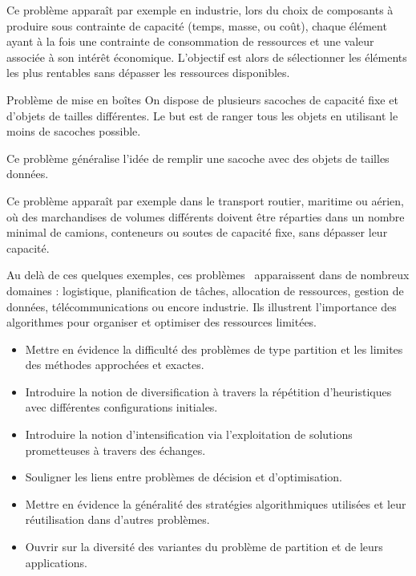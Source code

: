 \documentclass[a4paper,twoside]{article}
\begin{document}
Ce problème apparaît par exemple en industrie, lors du choix de composants à produire sous contrainte de capacité (temps, masse, ou coût), chaque élément ayant à la fois une contrainte de consommation de ressources et une valeur associée à son intérêt économique. L'objectif est alors de sélectionner les éléments les plus rentables sans dépasser les ressources disponibles.

\begin{definition}{Problème de mise en boîtes}
  On dispose de plusieurs sacoches de capacité fixe et d'objets de tailles différentes.
  Le but est de ranger tous les objets en utilisant le moins de sacoches possible.

  Ce problème généralise l'idée de remplir une sacoche avec des objets de tailles données.
\end{definition}

Ce problème apparaît par exemple dans le transport routier, maritime ou aérien, où des marchandises de volumes différents doivent être réparties dans un nombre minimal de camions, conteneurs ou soutes de capacité fixe, sans dépasser leur capacité.

Au delà de ces quelques exemples, ces problèmes~\cite{PP,SSP,KP,MS,BP} apparaissent dans de nombreux domaines : logistique, planification de tâches, allocation de ressources, gestion de données, télécommunications ou encore industrie.
Ils illustrent l'importance des algorithmes pour organiser et optimiser des ressources limitées.

\begin{debriefing}
  \begin{itemize}
  \item Mettre en évidence la difficulté des problèmes de type partition et les limites des méthodes approchées et exactes.
  \item Introduire la notion de diversification à travers la répétition d'heuristiques avec différentes configurations initiales.
  \item Introduire la notion d'intensification via l'exploitation de solutions prometteuses à travers des échanges.
  \item Souligner les liens entre problèmes de décision et d'optimisation.
  \item Mettre en évidence la généralité des stratégies algorithmiques utilisées et leur réutilisation dans d'autres problèmes.
  \item Ouvrir sur la diversité des variantes du problème de partition et de leurs applications.
  \end{itemize}
\end{debriefing}
\end{document}
